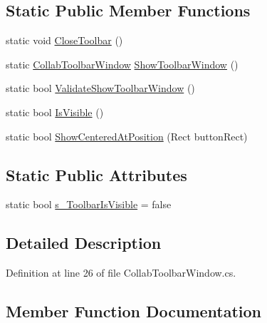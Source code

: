 \subsection*{Static Public Member Functions}
\begin{DoxyCompactItemize}
\item 
static void \mbox{\hyperlink{class_unity_editor_1_1_collab_toolbar_window_a6fa65e2eb32d15c94eb5078b6903364d}{Close\+Toolbar}} ()
\item 
static \mbox{\hyperlink{class_unity_editor_1_1_collab_toolbar_window}{Collab\+Toolbar\+Window}} \mbox{\hyperlink{class_unity_editor_1_1_collab_toolbar_window_aa84153c666ed6e13eb4bc1fef1559ea0}{Show\+Toolbar\+Window}} ()
\item 
static bool \mbox{\hyperlink{class_unity_editor_1_1_collab_toolbar_window_a7084bac88b2d81368585a696210530fe}{Validate\+Show\+Toolbar\+Window}} ()
\item 
static bool \mbox{\hyperlink{class_unity_editor_1_1_collab_toolbar_window_aed8304d575623b2234507f122ff950db}{Is\+Visible}} ()
\item 
static bool \mbox{\hyperlink{class_unity_editor_1_1_collab_toolbar_window_aad499eca0b3e322ff1d539ea5a048402}{Show\+Centered\+At\+Position}} (Rect button\+Rect)
\end{DoxyCompactItemize}
\subsection*{Static Public Attributes}
\begin{DoxyCompactItemize}
\item 
static bool \mbox{\hyperlink{class_unity_editor_1_1_collab_toolbar_window_a717c4c997c13151347d5cfd47b7bb16d}{s\+\_\+\+Toolbar\+Is\+Visible}} = false
\end{DoxyCompactItemize}


\subsection{Detailed Description}


Definition at line 26 of file Collab\+Toolbar\+Window.\+cs.



\subsection{Member Function Documentation}
\mbox{\label{class_unity_editor_1_1_collab_toolbar_window_a6fa65e2eb32d15c94eb5078b6903364d}} 
